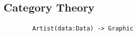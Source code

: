 \documentclass[xcolor={dvipsnames}, handout]{beamer}
\begin{document}

\subsection{Category Theory}
\begin{frame}[fragile]{}
    \begin{verbatim}
        Artist(data:Data) -> Graphic
    \end{verbatim}
\end{frame}
\end{document}
